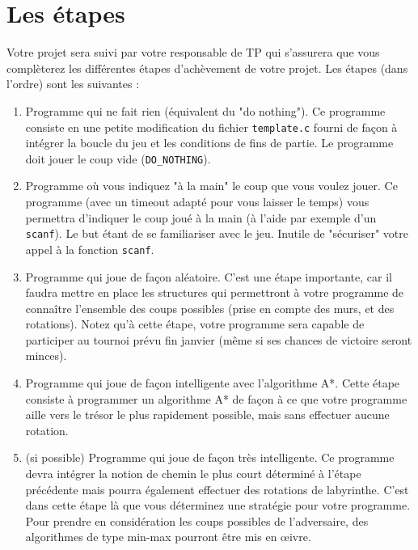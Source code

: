 \documentclass[french,12pt,a4paper,twoside,openright,titlepage]{report}
\begin{document}
\section{Les étapes}
Votre projet sera suivi par votre responsable de TP qui s'assurera que vous complèterez les différentes étapes d'achèvement de votre projet. Les étapes (dans l'ordre) sont les suivantes : 
\begin{enumerate}
 \item Programme qui ne fait rien (équivalent du "do nothing"). Ce programme consiste en une petite modification du fichier \verb|template.c| fourni de façon à intégrer la boucle du jeu et les conditions de fins de partie. Le programme doit jouer le coup vide (\verb|DO_NOTHING|).
 \item Programme où vous indiquez "à la main" le coup que vous voulez jouer. Ce programme (avec un timeout adapté pour vous laisser le temps) vous permettra d'indiquer le coup joué à la main (à l'aide par exemple d'un \verb|scanf|). Le but étant de se familiariser avec le jeu. Inutile de "sécuriser" votre appel à la fonction \verb|scanf|.
 \item Programme qui joue de façon aléatoire. C'est une étape importante, car il faudra mettre en place les structures qui permettront à votre programme de connaître l'ensemble des coups possibles (prise en compte des murs, et des rotations). Notez qu'à cette étape, votre programme sera capable de participer au tournoi prévu fin janvier (même si ses chances de victoire seront minces).
 \item Programme qui joue de façon intelligente avec l'algorithme A*. Cette étape consiste à programmer un algorithme A*
 de façon à ce que votre programme aille vers le trésor le plus rapidement possible, mais sans effectuer aucune rotation.
 \item (si possible) Programme qui joue de façon très intelligente. Ce programme devra intégrer la notion de chemin le plus court déterminé à l'étape précédente mais pourra également effectuer des rotations de labyrinthe. C'est dans cette étape là que vous déterminez une stratégie pour votre programme.\\
 Pour prendre en considération les coups possibles de l'adversaire, des algorithmes de type min-max pourront être mis en \oe ivre.
 \end{enumerate}
\end{document}
